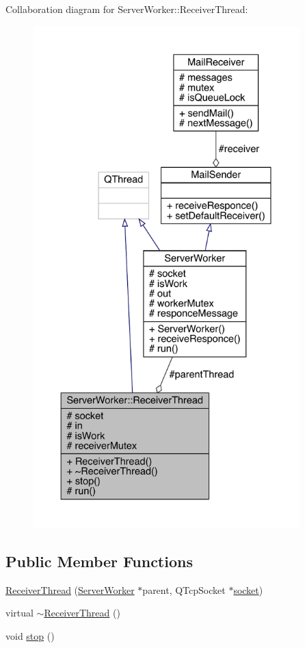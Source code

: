 Collaboration diagram for Server\+Worker\+:\+:Receiver\+Thread\+:
\nopagebreak
\begin{figure}[H]
\begin{center}
\leavevmode
\includegraphics[height=550pt]{d9/dd0/a00191}
\end{center}
\end{figure}
\subsection*{Public Member Functions}
\begin{DoxyCompactItemize}
\item 
\hyperlink{a00193_a4d4ad81a3aa7b6b71eb8d9345f9b7924}{Receiver\+Thread} (\hyperlink{a00185}{Server\+Worker} $\ast$parent, Q\+Tcp\+Socket $\ast$\hyperlink{a00193_a9dde916368513ce6a9548e923d2334fb}{socket})
\item 
virtual \hyperlink{a00193_a301c367fce51a745fef83c7c200f7eeb}{$\sim$\+Receiver\+Thread} ()
\item 
void \hyperlink{a00193_ab4b5a368d07b2670c72be1a04404f76d}{stop} ()
\end{DoxyCompactItemize}

